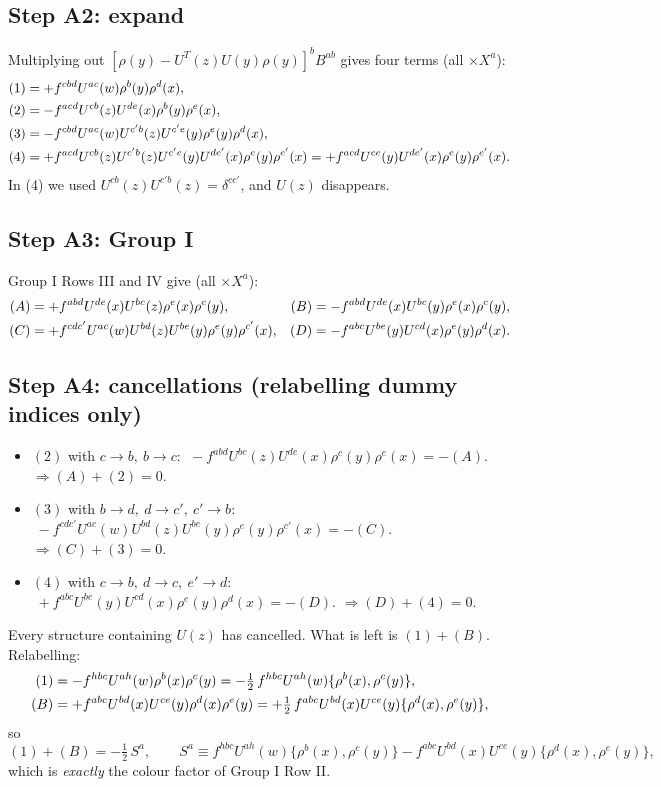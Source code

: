\documentclass[10pt]{article}
\begin{document}
\subsection*{Step A2: expand}
Multiplying out $[\rho(y)-U^{T}(z)U(y)\rho(y)]^{b}B^{ab}$ gives four terms (all $\times X^{a}$):
\begin{align}
(1)&=+f^{cbd}U^{ac}(w)\rho^{b}(y)\rho^{d}(x),\notag\\
(2)&=-f^{acd}U^{cb}(z)U^{de}(x)\rho^{b}(y)\rho^{e}(x),\notag\\
(3)&=-f^{cbd}U^{ac}(w)U^{c'b}(z)U^{c'e}(y)\rho^{e}(y)\rho^{d}(x),\notag\\
(4)&=+f^{acd}U^{cb}(z)U^{c'b}(z)U^{c'e}(y)U^{de'}(x)\rho^{e}(y)\rho^{e'}(x)=+f^{acd}U^{ce}(y)U^{de'}(x)\rho^{e}(y)\rho^{e'}(x).
\end{align}
In (4) we used $U^{cb}(z)U^{c'b}(z)=\delta^{cc'}$, and $U(z)$ disappears.

\subsection*{Step A3: Group I}
Group I Rows III and IV give (all $\times X^{a}$):
\begin{align}
(A)&=+f^{abd}U^{de}(x)U^{bc}(z)\rho^{e}(x)\rho^{c}(y), &
(B)&=-f^{abd}U^{de}(x)U^{bc}(y)\rho^{e}(x)\rho^{c}(y),\notag\\
(C)&=+f^{cdc'}U^{ac}(w)U^{bd}(z)U^{be}(y)\rho^{e}(y)\rho^{c'}(x), &
(D)&=-f^{abc}U^{be}(y)U^{cd}(x)\rho^{e}(y)\rho^{d}(x).
\end{align}

\subsection*{Step A4: cancellations (relabelling dummy indices only)}
\begin{itemize}
\item $(2)$ with $c\to b,\ b\to c$: $\;-f^{abd}U^{bc}(z)U^{de}(x)\rho^{c}(y)\rho^{e}(x)=-(A)$. \hfill $\Rightarrow (A)+(2)=0$.
\item $(3)$ with $b\to d,\ d\to c',\ c'\to b$: $\;-f^{cdc'}U^{ac}(w)U^{bd}(z)U^{be}(y)\rho^{e}(y)\rho^{c'}(x)=-(C)$. \hfill $\Rightarrow (C)+(3)=0$.
\item $(4)$ with $c\to b,\ d\to c,\ e'\to d$: $\;+f^{abc}U^{be}(y)U^{cd}(x)\rho^{e}(y)\rho^{d}(x)=-(D)$. \hfill $\Rightarrow (D)+(4)=0$.
\end{itemize}
Every structure containing $U(z)$ has cancelled. What is left is $(1)+(B)$. Relabelling:
\begin{align}
(1)&=-f^{hbc}U^{ah}(w)\rho^{b}(x)\rho^{c}(y)=-\tfrac12\,f^{hbc}U^{ah}(w)\{\rho^{b}(x),\rho^{c}(y)\},\notag\\
(B)&=+f^{abc}U^{bd}(x)U^{ce}(y)\rho^{d}(x)\rho^{e}(y)=+\tfrac12\,f^{abc}U^{bd}(x)U^{ce}(y)\{\rho^{d}(x),\rho^{e}(y)\},
\end{align}
so
\begin{equation}
(1)+(B)=-\tfrac12\,S^{a},\qquad S^{a}\equiv f^{hbc}U^{ah}(w)\{\rho^{b}(x),\rho^{c}(y)\}-f^{abc}U^{bd}(x)U^{ce}(y)\{\rho^{d}(x),\rho^{e}(y)\},
\end{equation}
which is \emph{exactly} the colour factor of Group I Row II.
\end{document}
